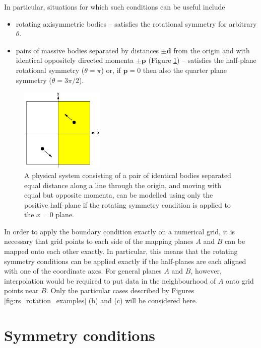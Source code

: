 \documentclass{article}
\newif\ifpdf
\begin{document}
%
In particular, situations for which such conditions can be useful
include
\begin{itemize}
  \item rotating axisymmetric bodies -- satisfies the rotational 
    symmetry for arbitrary $\theta$.
  \item pairs of massive bodies separated by distances $\pm
    \mathbf{d}$ from the origin and with identical oppositely directed
    momenta $\pm \mathbf{p}$ (Figure \ref{fig:rs_bbh}) -- satisfies
    the half-plane rotational symmetry ($\theta=\pi$) or, if
    $\mathbf{p}=0$ then also the quarter plane symmetry
    ($\theta=3\pi/2$).
\end{itemize}
\begin{figure}
\centering
\ifpdf
\else
\includegraphics[height=40mm]{fig/rotate_bbh.eps}
\fi
\caption{A physical system consisting of a pair of identical bodies
  separated equal distance along a line through the origin, and moving
  with equal but opposite momenta, can be modelled using only the
  positive half-plane if the rotating symmetry condition is applied to
  the $x=0$ plane.}
\label{fig:rs_bbh}
\end{figure}

In order to apply the boundary condition exactly on a numerical grid,
it is necessary that grid points to each side of the mapping planes
$A$ and $B$ can be mapped onto each other exactly. In particular, this
means that the rotating symmetry conditions can be applied exactly if
the half-planes are each aligned with one of the coordinate axes. For
general planes $A$ and $B$, however, interpolation would be required
to put data in the neighbourhood of $A$ onto grid points near
$B$. Only the particular cases described by Figures
\ref{fig:rs_rotation_examples} (b) and (c) will be
considered here.

\section{Symmetry conditions}
\label{sec:rs_application}
\end{document}
